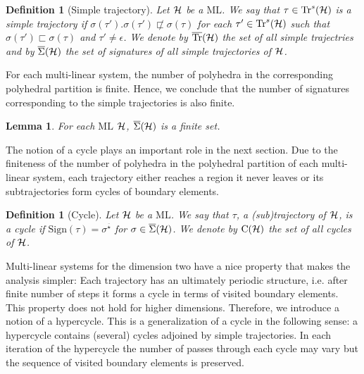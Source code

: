 \documentclass[copyright,creativecommons]{packages/eptcs}
\newcommand{\ml}{\mbox{ML}}
\newcommand{\traj}{\tau}
\newcommand{\Cycle}{\mbox{C}}
\newcommand{\sign}{{\mbox{Sign}}}
\newcommand{\seq}{\overline{\star}}
\newcommand{\sgn}{\Sigma}
\newcommand{\ssgn}{\overline{\sgn}}
\newcommand{\Trj}{\mbox{Tr}}
\newcommand{\STrj}{\overline{\Trj}}
\newtheorem{lemma}[theorem]{Lemma}
\newtheorem{definition}[theorem]{Definition}
\begin{document}
\begin{definition}[Simple trajectory] Let  $\cal{H}$ be a $\ml$.   We say that $\tau\in\Trj^s(\cal{H})$ is a simple  trajectory if  $\sigma(\traj').\sigma(\traj')\not\sqsubset\sigma(\traj)$
 for each $\traj'\in\Trj^s(\cal{H})$ such that $\sigma(\traj')\sqsubset\sigma(\tau)$ and $\traj'\neq \epsilon$.  We denote by $\STrj(\cal H)$ the set of all simple trajectries and by 
$\ssgn(\cal{H})$ the set of signatures of all simple  trajectories of $\cal{H}$.  
\end{definition}

For each multi-linear system,  the number of polyhedra in the corresponding  polyhedral partition is finite. Hence, we conclude that the number of signatures corresponding to the simple trajectories is also finite. 

\begin{lemma}\label{lemma:finite_simple_signature}  For each $\ml$  $\cal{H}$,  $\ssgn(\cal{H})$ is a finite set.  
\end{lemma}

The  notion of a cycle plays an important role in the next  section. Due to the finiteness of the  number of polyhedra in the polyhedral partition of each multi-linear system, each trajectory either reaches a region it never leaves or its subtrajectories  form cycles of boundary elements. 

\begin{definition}[Cycle]  Let  $\cal{H}$ be a $\ml$. We say that  $\traj$, a (sub)trajectory of  $\cal H$,  is a cycle if $\sign(\traj)=\sigma^{\seq}$ for $\sigma\in\ssgn(\cal H)$. We denote by $\Cycle(\cal H)$ the set of all cycles of $\cal H$.
 
\end{definition}


Multi-linear systems for the dimension two have a nice property that makes the analysis  simpler: 
Each trajectory has an ultimately periodic structure, i.e. after finite number of steps
it forms a cycle in terms of visited boundary elements. This property does not hold for higher dimensions.  Therefore, we introduce a   notion of a hypercycle. This  is a generalization of a cycle in the following sense: a hypercycle contains (several) cycles adjoined by simple trajectories. In each iteration of the hypercycle the number of passes through each  cycle may vary but the sequence of visited boundary elements is preserved. 
\end{document}
